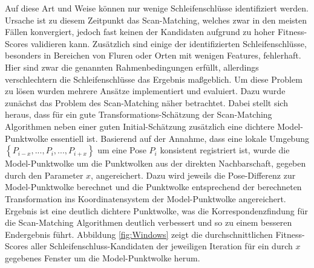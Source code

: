 Auf diese Art und Weise können nur wenige Schleifenschlüsse identifiziert werden. Ursache ist zu diesem Zeitpunkt das Scan-Matching, welches zwar in den meisten Fällen konvergiert, jedoch fast keinen der Kandidaten aufgrund zu hoher Fitness-Scores validieren kann. Zusätzlich sind einige der identifizierten Schleifenschlüsse, besonders in Bereichen von Fluren oder Orten mit wenigen Features, fehlerhaft. Hier sind zwar die genannten Rahmenbedingungen erfüllt, allerdings verschlechtern die Schleifenschlüsse das Ergebnis maßgeblich. Um diese Problem zu lösen wurden mehrere Ansätze implementiert und evaluiert. Dazu wurde zunächst das Problem des Scan-Matching näher betrachtet. Dabei stellt sich heraus, dass für ein gute Transformations-Schätzung der Scan-Matching Algorithmen neben einer guten Initial-Schätzung zusätzlich eine dichtere Model-Punktwolke essentiell ist. Basierend auf der Annahme, dass eine lokale Umgebung $\left\lbrace P_{i - x}, ..., P_i, ..., P_{i+x} \right\rbrace$ um eine Pose $P_i$ konsistent registriert ist, wurde die Model-Punktwolke um die Punktwolken aus der direkten Nachbarschaft, gegeben durch den Parameter $x$, angereichert. Dazu wird jeweils die Pose-Differenz zur Model-Punktwolke berechnet und die Punktwolke entsprechend der berechneten Transformation ins Koordinatensystem der Model-Punktwolke angereichert. Ergebnis ist eine deutlich dichtere Punktwolke, was die Korrespondenzfindung für die Scan-Matching Algorithmen deutlich verbessert und so zu einem besseren Endergebnis führt. Abbildung \ref{fig:Windows} zeigt die durchschnittlichen Fitness-Scores aller Schleifenschluss-Kandidaten der jeweiligen Iteration für ein durch $x$ gegebenes Fenster um die Model-Punktwolke herum.

